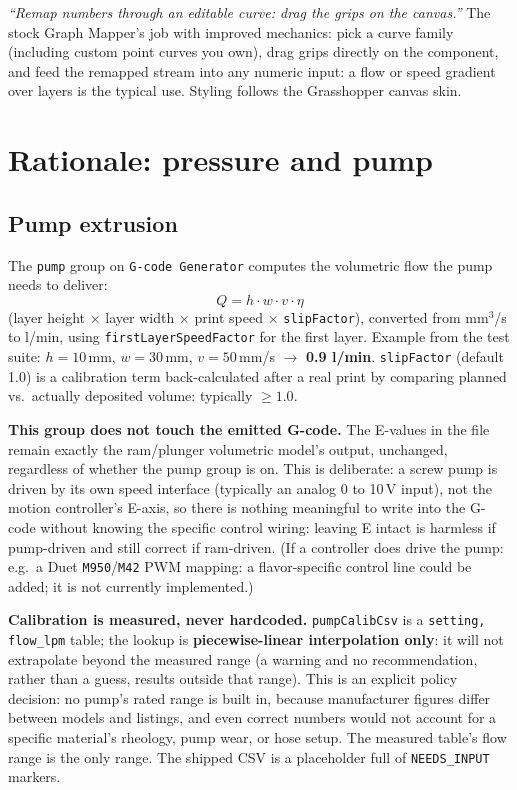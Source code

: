\documentclass[11pt]{article}
\newcommand{\param}[1]{\texttt{#1}}
\begin{document}
\emph{``Remap numbers through an editable curve: drag the grips on the
canvas.''} The stock Graph Mapper's job with improved mechanics: pick a
curve family (including custom point curves you own), drag grips
directly on the component, and feed the remapped stream into any
numeric input: a flow or speed gradient over layers is the typical
use. Styling follows the Grasshopper canvas skin.

\section{Rationale: pressure and pump}

\subsection{Pump extrusion}

The \param{pump} group on \param{G-code Generator} computes the
volumetric flow the pump needs to deliver:
\[
Q = h \cdot w \cdot v \cdot \eta
\]
(layer height $\times$ layer width $\times$ print speed $\times$
\param{slipFactor}), converted from mm$^3$/s to l/min, using
\param{firstLayerSpeedFactor} for the first layer. Example from the test
suite: $h=10$\,mm, $w=30$\,mm, $v=50$\,mm/s $\rightarrow$ \textbf{0.9
l/min}. \param{slipFactor} (default 1.0) is a calibration term
back-calculated after a real print by comparing planned vs.\ actually
deposited volume: typically $\geq 1.0$.

\textbf{This group does not touch the emitted G-code.} The E-values in
the file remain exactly the ram/plunger volumetric model's output,
unchanged, regardless of whether the pump group is on. This is
deliberate: a screw pump is driven by its own speed interface (typically
an analog 0 to 10\,V input), not the motion controller's E-axis, so there is nothing
meaningful to write into the G-code without knowing the specific control
wiring: leaving E intact is harmless if pump-driven and still correct
if ram-driven. (If a controller does drive the pump: e.g.\ a Duet
\texttt{M950}/\texttt{M42} PWM mapping: a flavor-specific control line
could be added; it is not currently implemented.)

\textbf{Calibration is measured, never hardcoded.} \param{pumpCalibCsv}
is a \texttt{setting, flow\_lpm} table; the lookup is
\textbf{piecewise-linear interpolation only}: it will not extrapolate
beyond the measured range (a warning and no recommendation, rather than
a guess, results outside that range). This is an explicit policy
decision: no pump's rated range is built in, because manufacturer
figures differ between models and listings, and even correct numbers
would not account for a specific material's rheology, pump wear, or
hose setup. The measured table's flow range is the only range. The shipped CSV is a placeholder
full of \texttt{NEEDS\_INPUT} markers.
\end{document}
